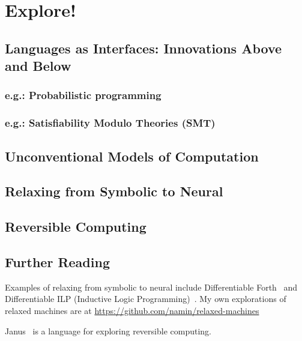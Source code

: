 \chapter{Explore!}

\section{Languages as Interfaces: Innovations Above and Below}
\subsection{e.g.: Probabilistic programming}
\subsection{e.g.: Satisfiability Modulo Theories (SMT)}

\section{Unconventional Models of Computation}

\section{Relaxing from Symbolic to Neural}

\section{Reversible Computing}

\section{Further Reading}

Examples of relaxing from symbolic to neural include Differentiable Forth~\citep{diffForth} and Differentiable ILP (Inductive Logic Programming)~\citep{diffILP}.
My own explorations of relaxed machines are at \url{https://github.com/namin/relaxed-machines}

Janus~\citep{janus} is a language for exploring reversible computing.
